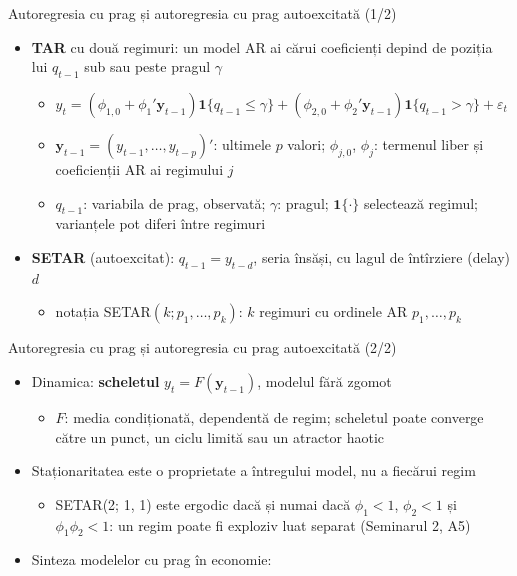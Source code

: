 \begin{frame}{Autoregresia cu prag și autoregresia cu prag autoexcitată (1/2)}
\itemsize{\small}
\begin{itemize}
    \item \textbf{TAR} cu două regimuri: un model AR ai cărui coeficienți depind de poziția lui $q_{t-1}$ sub sau peste pragul $\gamma$
    \begin{itemize}
        \item $y_t = (\phi_{1,0} + \phi_1'\mathbf y_{t-1})\mathbf 1\{q_{t-1} \le \gamma\} + (\phi_{2,0} + \phi_2'\mathbf y_{t-1})\mathbf 1\{q_{t-1} > \gamma\} + \varepsilon_t$
        \item $\mathbf y_{t-1} = (y_{t-1}, \dots, y_{t-p})'$: ultimele $p$ valori; $\phi_{j,0}$, $\phi_j$: termenul liber și coeficienții AR ai regimului $j$
        \item $q_{t-1}$: variabila de prag, observată; $\gamma$: pragul; $\mathbf 1\{\cdot\}$ selectează regimul; varianțele pot diferi între regimuri
    \end{itemize}
    \item \textbf{SETAR} (autoexcitat): $q_{t-1} = y_{t-d}$, seria însăși, cu lagul de întîrziere (delay) $d$
    \begin{itemize}
        \item notația SETAR$(k; p_1, \dots, p_k)$: $k$ regimuri cu ordinele AR $p_1, \dots, p_k$ 
    \end{itemize}
\end{itemize}
\end{frame}

\begin{frame}{Autoregresia cu prag și autoregresia cu prag autoexcitată (2/2)}
\itemsize{\small}
\begin{itemize}
    \item Dinamica: \textbf{scheletul} $y_t = F(\mathbf y_{t-1})$, modelul fără zgomot
    \begin{itemize}
        \item $F$: media condiționată, dependentă de regim; scheletul poate converge către un punct, un ciclu limită sau un atractor haotic
    \end{itemize}
    \item Staționaritatea este o proprietate a întregului model, nu a fiecărui regim
    \begin{itemize}
        \item SETAR(2; 1, 1) este ergodic dacă și numai dacă $\phi_1 < 1$, $\phi_2 < 1$ și $\phi_1\phi_2 < 1$: un regim poate fi exploziv luat separat (Seminarul 2, A5)
    \end{itemize}
    \item Sinteza modelelor cu prag în economie: 
\end{itemize}
\end{frame}

